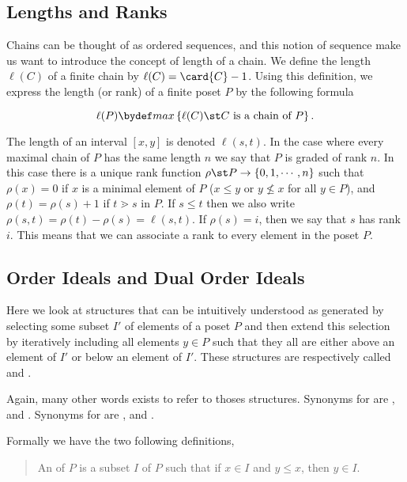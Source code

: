 \subsection*{Lengths and Ranks}

Chains can be thought of as ordered sequences, and this notion of sequence make
us want to introduce the concept of length of a chain. We define the length
$\ell(C)$ of a finite chain by $\ell(C) = \card{C} - 1$. Using this definition, we
express the length (or rank) of a finite poset $P$ by the following formula

$$\ell(P) \bydef max\left\{{\ell(C) \st C ~\text{is a chain of}~ P}\right\}.$$

The length of an interval $[x, y]$ is denoted $\ell(s, t)$. In the case where
every maximal chain of $P$ has the same length $n$ we say that $P$ is graded of
rank $n$. In this case there is a unique rank function $\rho \st P \to \left\{{0,
1, \cdots , n}\right\}$ such that $\rho(x) = 0$ if $x$ is a minimal element of
$P$ ($x \le y$ or $y \nleq x$ for all $y \in P$), and $\rho(t) = \rho(s) + 1$
if $t \gtrdot s$ in $P$. If $s \le t$ then we also write $\rho(s, t) = \rho(t)
- \rho(s) = \ell(s, t)$. If $\rho(s) = i$, then we say that $s$ has rank $i$.
This means that we can associate a rank to every element in the poset $P$.


\subsection*{Order Ideals and Dual Order Ideals}

Here we look at structures that can be intuitively understood as generated by
selecting some subset $I'$ of elements of a poset $P$ and then extend this
selection by iteratively including all elements $y \in P$ such that they all
are either above an element of $I'$ or below an element of $I'$. These
structures are respectively called  and .

Again, many other words exists to refer to thoses structures. Synonyms for
 are ,  and
. Synonyms for  are
,  and .

Formally we have the two following definitions,

\begin{quotation}
An  of $P$ is a subset $I$ of $P$ such that if $x \in
I$ and $y \le x$, then $y \in I$.
\end{quotation}

